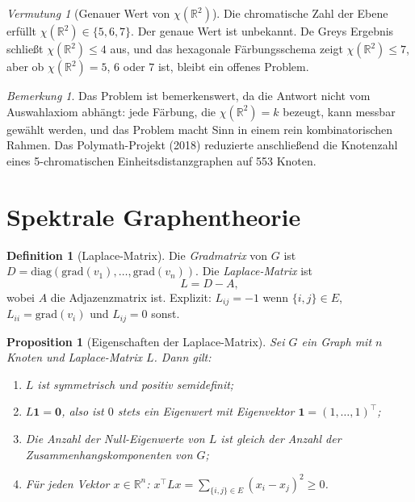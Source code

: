 \documentclass[12pt,a4paper]{amsart}
\newtheorem{proposition}[theorem]{Proposition}
\theoremstyle{definition}
\newtheorem{definition}[theorem]{Definition}
\theoremstyle{remark}
\newtheorem{remark}[theorem]{Bemerkung}
\newtheorem{conjecture}[theorem]{Vermutung}
\newcommand{\R}{\mathbb{R}}
\newcommand{\chr}{\chi}
\newcommand{\grad}{\mathrm{grad}}
\begin{document}
\begin{conjecture}[Genauer Wert von $\chr(\R^2)$]
\label{verm:hn-genau}
Die chromatische Zahl der Ebene erfüllt $\chr(\R^2) \in \{5, 6, 7\}$.
Der genaue Wert ist unbekannt. De Greys Ergebnis schließt $\chr(\R^2) \le 4$
aus, und das hexagonale Färbungsschema zeigt $\chr(\R^2) \le 7$, aber ob
$\chr(\R^2) = 5$, $6$ oder $7$ ist, bleibt ein offenes Problem.
\end{conjecture}

\begin{remark}
Das Problem ist bemerkenswert, da die Antwort nicht vom Auswahlaxiom abhängt:
jede Färbung, die $\chr(\R^2) = k$ bezeugt, kann messbar gewählt werden, und
das Problem macht Sinn in einem rein kombinatorischen Rahmen. Das
Polymath-Projekt (2018) reduzierte anschließend die Knotenzahl eines
5-chromatischen Einheitsdistanzgraphen auf 553 Knoten.
\end{remark}

\section{Spektrale Graphentheorie}
\label{sec:spektral}

\begin{definition}[Laplace-Matrix]
Die \emph{Gradmatrix} von $G$ ist $D = \mathrm{diag}(\grad(v_1), \ldots,
\grad(v_n))$. Die \emph{Laplace-Matrix} ist
\[
  L = D - A,
\]
wobei $A$ die Adjazenzmatrix ist. Explizit: $L_{ij} = -1$ wenn
$\{i,j\} \in E$, $L_{ii} = \grad(v_i)$ und $L_{ij} = 0$ sonst.
\end{definition}

\begin{proposition}[Eigenschaften der Laplace-Matrix]
\label{prop:laplace}
Sei $G$ ein Graph mit $n$ Knoten und Laplace-Matrix $L$. Dann gilt:
\begin{enumerate}[label=\upshape(\roman*)]
  \item $L$ ist symmetrisch und positiv semidefinit;
  \item $L \mathbf{1} = \mathbf{0}$, also ist $0$ stets ein Eigenwert mit
        Eigenvektor $\mathbf{1} = (1,\ldots,1)^\top$;
  \item Die Anzahl der Null-Eigenwerte von $L$ ist gleich der Anzahl der
        Zusammenhangskomponenten von $G$;
  \item Für jeden Vektor $x \in \R^n$:
        $x^\top L x = \sum_{\{i,j\} \in E} (x_i - x_j)^2 \ge 0$.
\end{enumerate}
\end{proposition}
\end{document}
